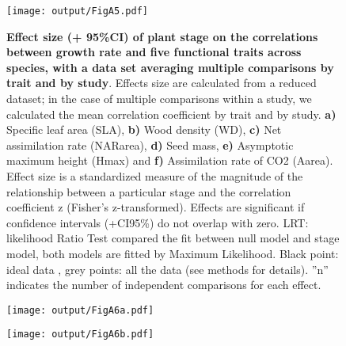 \documentclass[a4paper,11pt]{article}
\begin{document}
\begin{appendices}
\begin{figure}[h!]
\centering
\texttt{[image: output/FigA5.pdf]}
\caption{\textbf{Effect size (+ 95\%CI) of plant stage on the correlations between growth rate and five functional traits across species, with a data set averaging multiple comparisons by trait and by study}. Effects size are calculated from a reduced dataset; in the case of multiple comparisons within a study, we calculated the mean correlation coefficient by trait and by study. \textbf{a)} Specific leaf area (SLA), \textbf{b)} Wood density (WD), \textbf{c)} Net assimilation rate (NARarea), \textbf{d)} Seed mass, \textbf{e)} Asymptotic maximum height (Hmax) and \textbf{f)} Assimilation rate of CO2 (Aarea). Effect size is a standardized measure of the magnitude of the relationship between a particular stage and the correlation coefficient z (Fisher's z-transformed). Effects are significant if confidence intervals (+CI95\%) do not overlap with zero. LRT: likelihood Ratio Test compared the fit between null model and stage model, both models are fitted by Maximum Likelihood. Black point: ideal data , grey points: all the data (see methods for details). ''n'' indicates the number of independent comparisons for each effect.}
\label{fig:figA5}
\end{figure}


\begin{figure}[h!]
\centering
\texttt{[image: output/FigA6a.pdf]}
\end{figure}

\begin{figure}[h!]
\centering
\texttt{[image: output/FigA6b.pdf]}
\end{figure}


\end{appendices}
\end{document}
